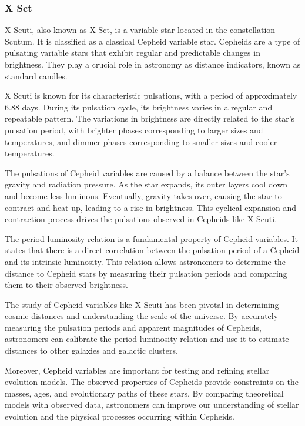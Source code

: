 \subsubsection*{ X Sct }
X Scuti, also known as X Sct, is a variable star located in the constellation Scutum. It is classified as a classical Cepheid variable star. Cepheids are a type of pulsating variable stars that exhibit regular and predictable changes in brightness. They play a crucial role in astronomy as distance indicators, known as standard candles.

X Scuti is known for its characteristic pulsations, with a period of approximately 6.88 days. During its pulsation cycle, its brightness varies in a regular and repeatable pattern. The variations in brightness are directly related to the star's pulsation period, with brighter phases corresponding to larger sizes and temperatures, and dimmer phases corresponding to smaller sizes and cooler temperatures.

The pulsations of Cepheid variables are caused by a balance between the star's gravity and radiation pressure. As the star expands, its outer layers cool down and become less luminous. Eventually, gravity takes over, causing the star to contract and heat up, leading to a rise in brightness. This cyclical expansion and contraction process drives the pulsations observed in Cepheids like X Scuti.

The period-luminosity relation is a fundamental property of Cepheid variables. It states that there is a direct correlation between the pulsation period of a Cepheid and its intrinsic luminosity. This relation allows astronomers to determine the distance to Cepheid stars by measuring their pulsation periods and comparing them to their observed brightness.

The study of Cepheid variables like X Scuti has been pivotal in determining cosmic distances and understanding the scale of the universe. By accurately measuring the pulsation periods and apparent magnitudes of Cepheids, astronomers can calibrate the period-luminosity relation and use it to estimate distances to other galaxies and galactic clusters.

Moreover, Cepheid variables are important for testing and refining stellar evolution models. The observed properties of Cepheids provide constraints on the masses, ages, and evolutionary paths of these stars. By comparing theoretical models with observed data, astronomers can improve our understanding of stellar evolution and the physical processes occurring within Cepheids.

